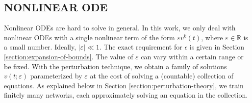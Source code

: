 \documentclass[accepted]{uai2023}
\begin{document}
\subsection{NONLINEAR ODE}
    Nonlinear ODEs are hard to solve in general. 
    In this work, we only deal with nonlinear ODEs with a single nonlinear term of the form $\varepsilon v^k(t)$, where $\varepsilon \in \mathbb{R}$ is a small number.
    Ideally, $|\varepsilon| \ll 1$. 
    The exact requirement for $\epsilon$ is given in Section \ref{section:expansion-of-bounds}.
    The value of $\varepsilon$ can vary within a certain range or be fixed.
    With the perturbation technique, we obtain a family of solutions $v(t;\varepsilon)$ parameterized by $\varepsilon$ at the cost of solving a (countable) collection of equations. 
    As explained below in Section \ref{section:perturbation-theory}, we train finitely many networks, each approximately solving an equation in the collection.
\end{document}
